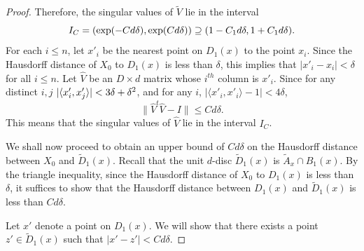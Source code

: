 \documentclass[final, 12pt]{colt2018} %
\begin{document}
\begin{proof}
Therefore, the singular values of $\tilde V$ lie in the interval $$I_C=(\exp(- C{d}\delta), \exp(C{d}\delta)) \supseteq (1 - C_1d{\mathbf{\delta}}, 1 + C_1d{\mathbf{\delta}}).$$
For each $i \leq n$, let $x'_i$ be the nearest point on $D_1(x)$ to the point $x_i$. Since the Hausdorff distance of $X_0$ to $D_1(x)$ is less than $\delta$, this implies that $|x'_i - x_i| < \delta$ for all $i \leq n$.
Let $\hat{V}$ be an $D \times d$ matrix whose $i^{th}$ column is $ x'_i$. Since for any distinct $i,j$ $|\langle x'_i, x'_j\rangle|<3\delta +{\mathbf{\delta}}^2$, and for any $i$, $|\langle x'_i , x'_i \rangle - 1|<4\delta$,  $$\|\hat{V}^t \hat{V} - I\| \leq C{d}\delta.$$ This means that the singular values of $\hat{V}$ lie in the interval $I_C$.

We shall now proceed to obtain an upper bound of $Cd\delta$ on the Hausdorff distance between $X_0$ and $\tilde{D}_1(x)$. Recall that the unit $d$-disc $\tilde{D}_1(x)$ is $\tilde{A}_x \cap B_1(x)$.  By the triangle inequality, since the Hausdorff distance of $X_0$ to $D_1(x)$ is less than $\delta$, it suffices to show that the Hausdorff distance between $D_1(x)$ and $\tilde{D}_1(x)$ is less than $Cd\delta.$




Let $x'$ denote a point on $D_1(x)$.  We will show that there exists a point $z' \in \tilde{D}_1(x)$ such that 
$|x' - z'| < C d \delta.$ 


\end{proof}
\end{document}
